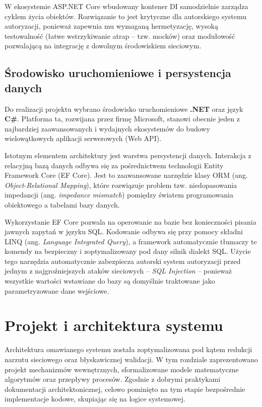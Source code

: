 \documentclass{SGGW-thesis}
\begin{document}
W ekosystemie ASP.NET Core wbudowany kontener DI samodzielnie zarządza cyklem życia obiektów. Rozwiązanie to jest krytyczne dla autorskiego systemu autoryzacji, ponieważ zapewnia mu wymaganą hermetyzację, wysoką testowalność (łatwe wstrzykiwanie atrap – tzw. mocków) oraz modułowość pozwalającą na integrację z dowolnym środowiskiem sieciowym.

\subsection{Środowisko uruchomieniowe i persystencja danych}

Do realizacji projektu wybrano środowisko uruchomieniowe \textbf{.NET} oraz język \textbf{C\#}. Platforma ta, rozwijana przez firmę Microsoft, stanowi obecnie jeden z najbardziej zaawansowanych i wydajnych ekosystemów do budowy wielowątkowych aplikacji serwerowych (Web API).

Istotnym elementem architektury jest warstwa persystencji danych. Interakcja z relacyjną bazą danych odbywa się za pośrednictwem technologii Entity Framework Core (EF Core). Jest to zaawansowane narzędzie klasy ORM (ang. \textit{Object-Relational Mapping}), które rozwiązuje problem tzw. niedopasowania impedancji (ang. \textit{impedance mismatch}) pomiędzy światem programowania obiektowego a tabelami bazy danych.

Wykorzystanie EF Core pozwala na operowanie na bazie bez konieczności pisania jawnych zapytań w języku SQL. Kodowanie odbywa się przy pomocy składni LINQ (ang. \textit{Language Integrated Query}), a framework automatycznie tłumaczy te komendy na bezpieczny i zoptymalizowany pod dany silnik dialekt SQL. Użycie tego narzędzia automatycznie zabezpiecza autorski system autoryzacji przed jednym z najgroźniejszych ataków sieciowych – \textit{SQL Injection} – ponieważ wszystkie wartości wstawiane do bazy są domyślnie traktowane jako parametryzowane dane wejściowe.
\clearpage

\section{Projekt i architektura systemu}

Architektura omawianego systemu została zoptymalizowana pod kątem redukcji narzutu sieciowego oraz błyskawicznej walidacji. W tym rozdziale zaprezentowano projekt mechanizmów wewnętrznych, sformalizowane modele matematyczne algorytmów oraz przepływy procesów. Zgodnie z dobrymi praktykami dokumentacji architektonicznej, celowo pominięto na tym etapie bezpośrednie implementacje kodowe, skupiając się na logice systemowej.
\end{document}
